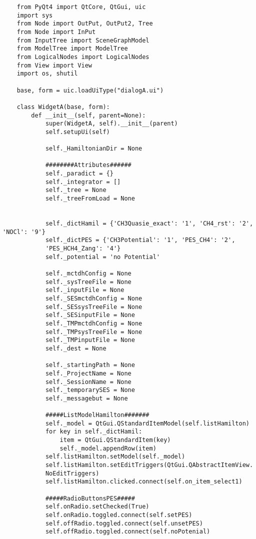 \begin{verbatim}
    from PyQt4 import QtCore, QtGui, uic
    import sys
    from Node import OutPut, OutPut2, Tree
    from Node import InPut
    from InputTree import SceneGraphModel
    from ModelTree import ModelTree
    from LogicalNodes import LogicalNodes
    from View import View
    import os, shutil
    
    base, form = uic.loadUiType("dialogA.ui")
    
    class WidgetA(base, form):
        def __init__(self, parent=None):
            super(WidgetA, self).__init__(parent)
            self.setupUi(self)
    
            self._HamiltonianDir = None
            
            ########Attributes######
            self._paradict = {}
            self._integrator = []
            self._tree = None
            self._treeFromLoad = None
    
    
            self._dictHamil = {'CH3Quasie_exact': '1', 'CH4_rst': '2', 'NOCl': '9'}
            self._dictPES = {'CH3Potential': '1', 'PES_CH4': '2', 
            'PES_HCH4_Zang': '4'}
            self._potential = 'no Potential'
    
            self._mctdhConfig = None 
            self._sysTreeFile = None
            self._inputFile = None
            self._SESmctdhConfig = None
            self._SESsysTreeFile = None
            self._SESinputFile = None
            self._TMPmctdhConfig = None
            self._TMPsysTreeFile = None
            self._TMPinputFile = None
            self._dest = None
    
            self._startingPath = None
            self._ProjectName = None
            self._SessionName = None
            self._temporarySES = None
            self._messagebut = None
    
            #####ListModelHamilton#######
            self._model = QtGui.QStandardItemModel(self.listHamilton)
            for key in self._dictHamil:
                item = QtGui.QStandardItem(key)
                self._model.appendRow(item)
            self.listHamilton.setModel(self._model)
            self.listHamilton.setEditTriggers(QtGui.QAbstractItemView.
            NoEditTriggers)
            self.listHamilton.clicked.connect(self.on_item_select1)
    
            #####RadioButtonsPES#####
            self.onRadio.setChecked(True)
            self.onRadio.toggled.connect(self.setPES)
            self.offRadio.toggled.connect(self.unsetPES)
            self.offRadio.toggled.connect(self.noPotenial)
    

\end{verbatim}
